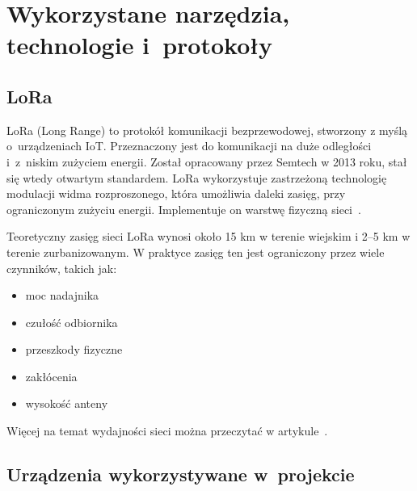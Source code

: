 
\chapter{Wykorzystane narzędzia, technologie i~protokoły}

\section{LoRa}
LoRa (Long Range) to protokół komunikacji bezprzewodowej, stworzony z myślą o~urządzeniach IoT.
Przeznaczony jest do komunikacji na duże odległości i~z~niskim zużyciem energii.
Został opracowany przez Semtech w 2013 roku, stał się wtedy otwartym standardem.
LoRa wykorzystuje zastrzeżoną technologię modulacji widma rozproszonego, która umożliwia daleki zasięg, przy ograniczonym zużyciu energii.
Implementuje on warstwę fizyczną sieci~\cite{lora:about}.

Teoretyczny zasięg sieci LoRa wynosi około 15 km w terenie wiejskim i 2--5 km w terenie zurbanizowanym.
W praktyce zasięg ten jest ograniczony przez wiele czynników, takich jak:
\begin{itemize}
    \item moc nadajnika
    \item czułość odbiornika
    \item przeszkody fizyczne
    \item zakłócenia
    \item wysokość anteny
\end{itemize}
Więcej na temat wydajności sieci można przeczytać w artykule~\cite{bib:lora-performance}.

\section{Urządzenia wykorzystywane w~projekcie}

